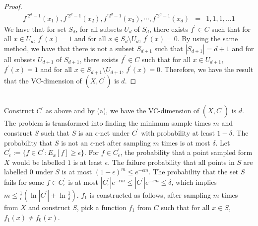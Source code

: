 \begin{proof}
\begin{align}
        \nonumber f^{\prime 2^d-1}(x_1),f^{\prime 2^d-1}(x_2),f^{\prime 2^d-1}(x_3),\cdots, f^{\prime 2^d-1}(x_d)&=&1,1,1,...1
    \end{align}
    We have that for set $S_d$, for all subsets $U_d$ of $S_d$, there exists $f^{\prime} \in C$ such that for all $x\in U_d$, $f^{\prime}(x) =1$ and for all $x\in S_d\setminus U_d$, $f^{\prime}(x)=0$.
    By using the same method, we have that there is not a subset $S_{d+1}$ such that $|S_{d+1}|=d+1$ and for all subsets $U_{d+1}$ of $S_{d+1}$, there exists $f^{\prime}\in C$ such that for all $x\in U_{d+1}$, $f^{\prime}(x)=1$ and for all $x\in S_{d+1}\setminus U_{d+1}$, $f^{\prime}(x)=0$.
    Therefore, we have the result that the VC-dimension of $(X, C^{\prime})$ is $d$.
\end{proof}
\noindent{}
\\
Construct $C^{\prime}$ as above and by (a), we have the VC-dimension of $(X, C^{\prime})$ is $d$.
The problem is transformed into finding the minimum sample times $m$ and construct $S$ such that $S$ is an 
$\epsilon$-net under $C^{\prime}$ with probability at least $1-\delta$.
The probability that $S$ is not an $\epsilon$-net after sampling $m$ times is at most $\delta$.
Let $C^{\prime}_\epsilon:=\{f\in C^{\prime}: E_x[f]\ge \epsilon\}$.
For $f\in C^{\prime}_\epsilon$, the probability that a point sampled form $X$ would be labelled $1$ is at least $\epsilon$.
The failure probability that all points in $S$ are labelled $0$ under $S$ is at most $(1-\epsilon)^m\le e^{-\epsilon m}$. 
The probability that the set $S$ fails for some $f\in C^{\prime}_\epsilon$ is at most $|C^{\prime}_\epsilon|e^{-\epsilon m}\le |C^{\prime}|e^{-\epsilon m}\le \delta$, which implies $m\le \frac{1}{\epsilon}(\ln |C^{\prime}|+\ln \frac{1}{\delta})$.
$f_1$ is constructed as follows, after sampling $m$ times from $X$ and construct $S$, pick a function $f_1$ from $C$ such that for all $x\in S$, $f_1(x)\neq f_0(x)$.

